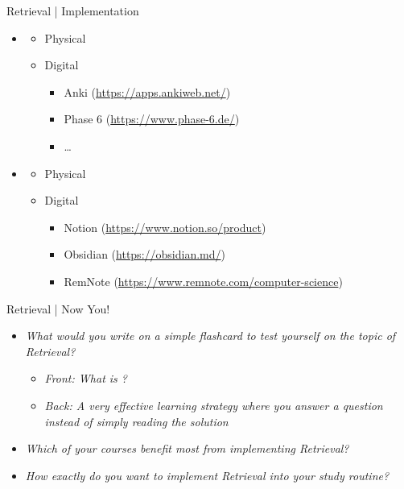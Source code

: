 \documentclass{ercisbeamer}
\begin{document}
\begin{frame}{Retrieval | Implementation}
    \begin{itemize}
        \item {}
        \begin{itemize}
            \item Physical
            \item Digital
            \begin{itemize}
                \item Anki (\url{https://apps.ankiweb.net/})
                \item Phase 6 (\url{https://www.phase-6.de/})
                \item …
            \end{itemize}
        \end{itemize}
        \item {}
        \begin{itemize}
            \item Physical
            \item Digital 
            \begin{itemize}
                \item Notion (\url{https://www.notion.so/product})
                \item Obsidian (\url{https://obsidian.md/})
                \item RemNote (\url{https://www.remnote.com/computer-science})
            \end{itemize}
        \end{itemize}
    \end{itemize}
\end{frame}

\begin{frame}{Retrieval | Now You!}
    \begin{itemize}
        \item \emph{What would you write on a simple flashcard to test yourself on the topic of Retrieval?} \pause
        \begin{itemize}
            \item \emph{Front: What is ?}
            \item \emph{Back: A very effective learning strategy where you answer a question instead of simply reading the solution}
        \end{itemize}
        \item \emph{Which of your courses benefit most from implementing Retrieval?}
        \item \emph{How exactly do you want to implement Retrieval into your study routine?}
    \end{itemize}
\end{frame}
\end{document}

